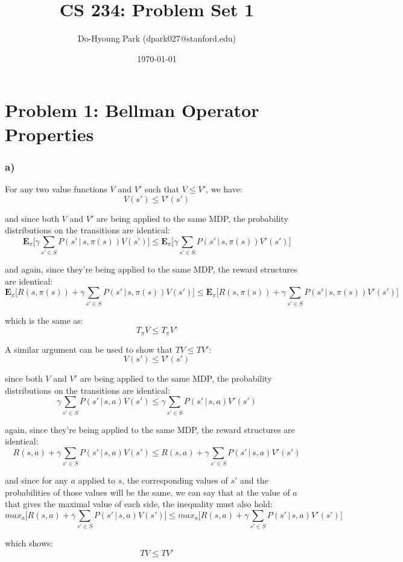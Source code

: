 \documentclass[11pt]{scrartcl}
\title{\textbf{CS 234: Problem Set 1}}
\author{Do-Hyoung Park (dpark027@stanford.edu)}
\date{\today}
\begin{document}
\maketitle

\section*{Problem 1: Bellman Operator Properties}
\subsubsection*{a)}
For any two value functions $V$ and $V'$ such that $V \leq V'$, we have:
$$V(s') \leq V'(s')$$

and since both $V$ and $V'$ are being applied to the same MDP, the probability distributions on the transitions are identical:
$$\bm{E}_{\pi} \bigg[ \gamma \sum_{s' \in S} P(s' \, | \, s,\pi(s)) V(s') \bigg] \leq \bm{E}_{\pi} \bigg[ \gamma \sum_{s' \in S} P(s' \, | \, s,\pi(s)) V'(s') \bigg]$$

and again, since they're being applied to the same MDP, the reward structures are identical:
$$\bm{E}_{\pi} \bigg[R(s, \pi(s)) + \gamma \sum_{s' \in S} P(s' \, | \, s,\pi(s)) V(s') \bigg] \leq \bm{E}_{\pi} \bigg[R(s, \pi(s)) + \gamma \sum_{s' \in S} P(s' \, | \, s,\pi(s)) V'(s') \bigg]$$

which is the same as:
$$\boxed{T_{\pi} V \leq T_{\pi} V'}$$

A similar argument can be used to show that $TV \leq TV'$:
$$V(s') \leq V'(s')$$

since both $V$ and $V'$ are being applied to the same MDP, the probability distributions on the transitions are identical:
$$\gamma \sum_{s' \in S} P(s' \, | \, s,a) V(s') \leq \gamma \sum_{s' \in S} P(s' \, | \, s,a) V'(s')$$

again, since they're being applied to the same MDP, the reward structures are identical:
$$R(s, a) + \gamma \sum_{s' \in S} P(s' \, | \, s,a) V(s') \leq R(s, a) + \gamma \sum_{s' \in S} P(s' \, | \, s,a) V'(s')$$

and since for any $a$ applied to $s$, the corresponding values of $s'$ and the probabilities of those values will be the same, we can say that at the value of $a$ that gives the maximal value of each side, the inequality must also hold:
$$max_{a} \bigg[R(s, a) + \gamma \sum_{s' \in S} P(s' \, | \, s,a) V(s') \bigg] \leq max_{a} \bigg[R(s, a) + \gamma \sum_{s' \in S} P(s' \, | \, s,a) V'(s') \bigg]$$

which shows:
$$\boxed{TV \leq TV'}$$
\end{document}

